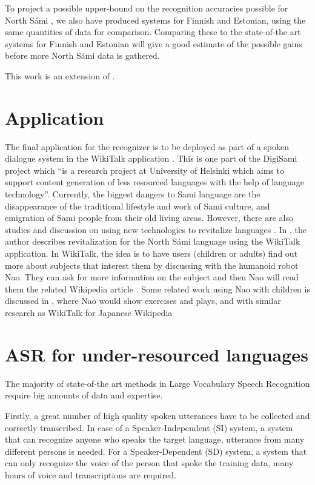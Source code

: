 \documentclass[b5paper]{article}
\newcommand{\ns}{{North Sámi }}
\begin{document}
To project a possible upper-bound on the recognition accuracies possible for \ns, we also have produced systems for Finnish and Estonian, using the same quantities of data for comparison. Comparing these to the state-of-the art systems for Finnish and Estonian will give a good estimate of the possible gains before more \ns data is gathered.

This work is an extension of \cite{leinonen2015}.

\section{Application}
The final application for the recognizer is to be deployed as part of a spoken dialogue system in the WikiTalk application \cite{wilcock2013wikitalk}. This is one part of the DigiSami project which ``is a research project at University of Helsinki which aims to support content generation of less resourced languages with the help of language technology''. Currently, the biggest dangers to Sami language are the disappearance of the traditional lifestyle and work of Sami culture, and emigration of Sami people from their old living areas. However, there are also studies and discussion on using new technologies to revitalize languages \cite{eisenlohr2004language}. In \cite{jokinen2014open}, the author describes revitalization for the \ns language using the WikiTalk application. In WikiTalk, the idea is to have users (children or adults) find out more about subjects that interest them by discussing with the humanoid robot Nao. They can ask for more information on the subject and then Nao will read them the related Wikipedia article \cite{jokinen2014multimodal}. Some related work using Nao with children is discussed in \cite{kruijff2012spoken}, where Nao would show exercises and plays, and with similar research as WikiTalk for Japanese Wikipedia \cite{kobayashi2011intelligent}




\section{ASR for under-resourced languages}
The majority of state-of-the art methods in Large Vocabulary Speech Recognition require big amounts of data and expertise. 

Firstly, a great number of high quality spoken utterances have to be collected and correctly transcribed. In case of a Speaker-Independent (SI) system, a system that can recognize anyone who speaks the target language, utterance from many different persons is needed. For a Speaker-Dependent (SD) system, a system that can only recognize the voice of the person that spoke the training data, many hours of voice and transcriptions are required.
\end{document}
